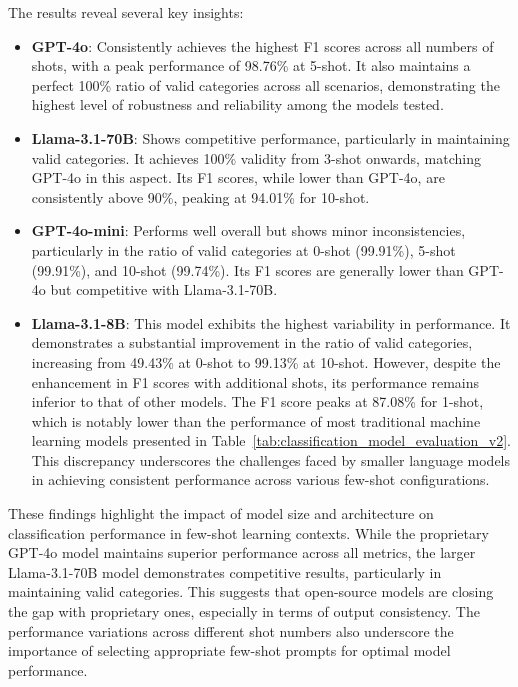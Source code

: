 The results reveal several key insights:

\begin{itemize}
    \item \textbf{GPT-4o}: Consistently achieves the highest F1 scores across all numbers of shots, with a peak performance of 98.76\% at 5-shot. It also maintains a perfect 100\% ratio of valid categories across all scenarios, demonstrating the highest level of robustness and reliability among the models tested.
    
    \item \textbf{Llama-3.1-70B}: Shows competitive performance, particularly in maintaining valid categories. It achieves 100\% validity from 3-shot onwards, matching GPT-4o in this aspect. Its F1 scores, while lower than GPT-4o, are consistently above 90\%, peaking at 94.01\% for 10-shot.
    
    \item \textbf{GPT-4o-mini}: Performs well overall but shows minor inconsistencies, particularly in the ratio of valid categories at 0-shot (99.91\%), 5-shot (99.91\%), and 10-shot (99.74\%). Its F1 scores are generally lower than GPT-4o but competitive with Llama-3.1-70B.

    \item \textbf{Llama-3.1-8B}: This model exhibits the highest variability in performance. It demonstrates a substantial improvement in the ratio of valid categories, increasing from 49.43\% at 0-shot to 99.13\% at 10-shot. However, despite the enhancement in F1 scores with additional shots, its performance remains inferior to that of other models. The F1 score peaks at 87.08\% for 1-shot, which is notably lower than the performance of most traditional machine learning models presented in Table~\ref{tab:classification_model_evaluation_v2}. This discrepancy underscores the challenges faced by smaller language models in achieving consistent performance across various few-shot configurations.
\end{itemize}

These findings highlight the impact of model size and architecture on classification performance in few-shot learning contexts. While the proprietary GPT-4o model maintains superior performance across all metrics, the larger Llama-3.1-70B model demonstrates competitive results, particularly in maintaining valid categories. This suggests that open-source models are closing the gap with proprietary ones, especially in terms of output consistency. The performance variations across different shot numbers also underscore the importance of selecting appropriate few-shot prompts for optimal model performance.

